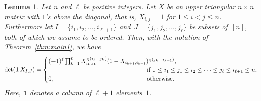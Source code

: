 \documentclass[12pt,reqno]{amsart}
\numberwithin{equation}{section}
\newtheorem{lemma}[theorem]{Lemma}
\theoremstyle{definition}
\theoremstyle{remark}
\begin{document}
\begin{lemma} \label{lem:X2}
Let $n$ and $\ell$ be positive integers.
Let $X$ be an upper triangular $n\times n$ matrix with $1$'s above
the diagonal, that is, $X_{i,j}=1$ for $1\le i<j\le n$.
Furthermore let $I=\{i_1,i_2,\dots,i_{\ell+1}\}$
and~$J=\{j_1,j_2,\dots,j_\ell\}$
be subsets of\/~$[n]$, both of which we assume to
be ordered.
Then, with the notation of Theorem~\ref{thm:main1}, we have
\begin{equation} \label{eq:X2} 
\det(\mathbf 1\,X_{I,J})=\begin{cases}
(-1)^\ell\prod _{k=1} ^{\ell}X_{i_k,i_k}^{\chi(i_k=j_k)}
(1-X_{i_{k+1},i_{k+1}})^{\chi(j_{k}=i_{k+1})},&\\
&\kern-2cm
\text{if }1\le i_1\le j_1\le i_2\le\dots\le j_\ell\le i_{\ell+1}\le n,\\
0,&\kern-2cm\text{otherwise}.
\end{cases}
\end{equation}
Here, $\mathbf1$ denotes a column of $\ell+1$ elements~$1$.
\end{lemma} 
\end{document}
